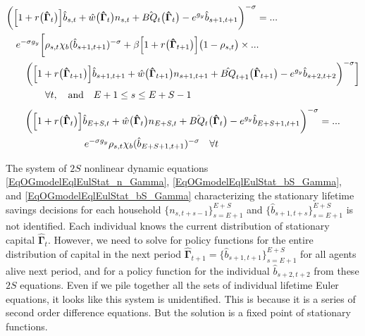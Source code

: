 \documentclass[letterpaper,12pt]{article}
\theoremstyle{definition}
\begin{document}
    \begin{equation}\label{EqOGmodelEqlEulStat_bs_Gamma}
      \begin{split}
        &\biggl(\Bigl[1 + r\bigl(\bm{\hat{\Gamma}}_t\bigr)\Bigr]\hat{b}_{s,t} + \hat{w}\bigl(\bm{\hat{\Gamma}}_t\bigr)n_{s,t} + \hat{BQ_t}\bigl(\bm{\hat{\Gamma}}_t\bigr) - e^{g_y}\hat{b}_{s+1,t+1}\biggr)^{-\sigma} = ...  \\
        & \quad e^{-\sigma g_y}\biggl[\rho_{s,t}\chi_b(\hat{b}_{s+1,t+1})^{-\sigma} + \beta\Bigl[1+r\bigl(\bm{\hat{\Gamma}}_{t+1}\bigr)\Bigr]\bigl(1 - \rho_{s,t}\bigr)\times...\\
        &\quad\quad\biggl(\Bigl[1 + r\bigl(\bm{\hat{\Gamma}}_{t+1}\bigr)\Bigr]\hat{b}_{s+1,t+1} + \hat{w}\bigl(\bm{\hat{\Gamma}}_{t+1}\bigr)n_{s+1,t+1} + \hat{BQ}_{t+1}\bigl(\bm{\hat{\Gamma}}_{t+1}\bigr) - e^{g_y}\hat{b}_{s+2,t+2}\biggr)^{-\sigma}\biggr] \\
        &\qquad\qquad\forall t,\quad\text{and}\quad E+1\leq s\leq E+S-1
      \end{split}
    \end{equation}
    \begin{equation}\label{EqOGmodelEqlEulStat_bS_Gamma}
      \begin{split}
        &\biggl(\Bigl[1 + r\bigl(\bm{\hat{\Gamma}}_t\bigr)\Bigr]\hat{b}_{E+S,t} + \hat{w}\bigl(\bm{\hat{\Gamma}}_t\bigr)n_{E+S,t} + \hat{BQ_t}\bigl(\bm{\hat{\Gamma}}_t\bigr) - e^{g_y}\hat{b}_{E+S+1,t+1}\biggr)^{-\sigma} = ...  \\
        &\qquad\qquad\qquad e^{-\sigma g_y}\rho_{s,t}\chi_b(\hat{b}_{E+S+1,t+1})^{-\sigma} \quad \forall t
      \end{split}
    \end{equation}

    The system of $2S$ nonlinear dynamic equations \eqref{EqOGmodelEqlEulStat_n_Gamma}, \eqref{EqOGmodelEqlEulStat_bS_Gamma}, and \eqref{EqOGmodelEqlEulStat_bS_Gamma} characterizing the stationary lifetime savings decisions for each household $\{n_{s,t+s-1}\}_{s=E+1}^{E+S}$ and $\{\hat{b}_{s+1,t+s}\}_{s=E+1}^{E+S}$ is not identified. Each individual knows the current distribution of stationary capital $\bm{\hat{\Gamma}}_t$. However, we need to solve for policy functions for the entire distribution of capital in the next period $\bm{\hat{\Gamma}}_{t+1}=\{\hat{b}_{s+1,t+1}\}_{s=E+1}^{E+S}$ for all agents alive next period, and for a policy function for the individual $\hat{b}_{s+2,t+2}$ from these $2S$ equations. Even if we pile together all the sets of individual lifetime Euler equations, it looks like this system is unidentified. This is because it is a series of second order difference equations. But the solution is a fixed point of stationary functions.
\end{document}
